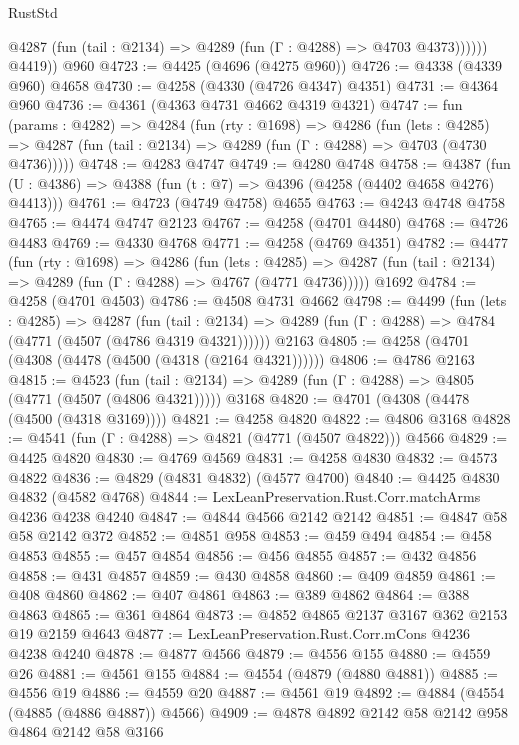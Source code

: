 \begin{lexlean}{RustStd}
\begin{coremodule}
              @4287 (fun (tail : @2134) => @4289 (fun (Γ : @4288) => @4703 @4373))))))
        @4419))
    @960
@4723 := @4425 (@4696 (@4275 @960))
@4726 := @4338 (@4339 @960) @4658
@4730 := @4258 (@4330 (@4726 @4347) @4351)
@4731 := @4364 @960
@4736 := @4361 (@4363 @4731 @4662 @4319 @4321)
@4747 := fun (params : @4282) =>
  @4284
    (fun (rty : @1698) =>
    @4286
      (fun (lets : @4285) =>
      @4287 (fun (tail : @2134) => @4289 (fun (Γ : @4288) => @4703 (@4730 @4736)))))
@4748 := @4283 @4747
@4749 := @4280 @4748
@4758 := @4387 (fun (U : @4386) => @4388 (fun (t : @7) => @4396 (@4258 (@4402 @4658 @4276) @4413)))
@4761 := @4723 (@4749 @4758) @4655
@4763 := @4243 @4748 @4758
@4765 := @4474 @4747 @2123
@4767 := @4258 (@4701 @4480)
@4768 := @4726 @4483
@4769 := @4330 @4768
@4771 := @4258 (@4769 @4351)
@4782 := @4477
    (fun (rty : @1698) =>
    @4286
      (fun (lets : @4285) =>
      @4287 (fun (tail : @2134) => @4289 (fun (Γ : @4288) => @4767 (@4771 @4736)))))
    @1692
@4784 := @4258 (@4701 @4503)
@4786 := @4508 @4731 @4662
@4798 := @4499
    (fun (lets : @4285) =>
    @4287
      (fun (tail : @2134) => @4289 (fun (Γ : @4288) => @4784 (@4771 (@4507 (@4786 @4319 @4321))))))
    @2163
@4805 := @4258 (@4701 (@4308 (@4478 (@4500 (@4318 (@2164 @4321))))))
@4806 := @4786 @2163
@4815 := @4523
    (fun (tail : @2134) => @4289 (fun (Γ : @4288) => @4805 (@4771 (@4507 (@4806 @4321)))))
    @3168
@4820 := @4701 (@4308 (@4478 (@4500 (@4318 @3169))))
@4821 := @4258 @4820
@4822 := @4806 @3168
@4828 := @4541 (fun (Γ : @4288) => @4821 (@4771 (@4507 @4822))) @4566
@4829 := @4425 @4820
@4830 := @4769 @4569
@4831 := @4258 @4830
@4832 := @4573 @4822
@4836 := @4829 (@4831 @4832) (@4577 @4700)
@4840 := @4425 @4830 @4832 (@4582 @4768)
@4844 := LexLeanPreservation.Rust.Corr.matchArms @4236 @4238 @4240
@4847 := @4844 @4566 @2142 @2142
@4851 := @4847 @58 @58 @2142 @372
@4852 := @4851 @958
@4853 := @459 @494
@4854 := @458 @4853
@4855 := @457 @4854
@4856 := @456 @4855
@4857 := @432 @4856
@4858 := @431 @4857
@4859 := @430 @4858
@4860 := @409 @4859
@4861 := @408 @4860
@4862 := @407 @4861
@4863 := @389 @4862
@4864 := @388 @4863
@4865 := @361 @4864
@4873 := @4852 @4865 @2137 @3167 @362 @2153 @19 @2159 @4643
@4877 := LexLeanPreservation.Rust.Corr.mCons @4236 @4238 @4240
@4878 := @4877 @4566
@4879 := @4556 @155
@4880 := @4559 @26
@4881 := @4561 @155
@4884 := @4554 (@4879 (@4880 @4881))
@4885 := @4556 @19
@4886 := @4559 @20
@4887 := @4561 @19
@4892 := @4884 (@4554 (@4885 (@4886 @4887)) @4566)
@4909 := @4878
    @4892
    @2142
    @58
    @2142
    @958
    @4864
    @2142
    @58
    @3166

\end{coremodule}
\end{lexlean}
